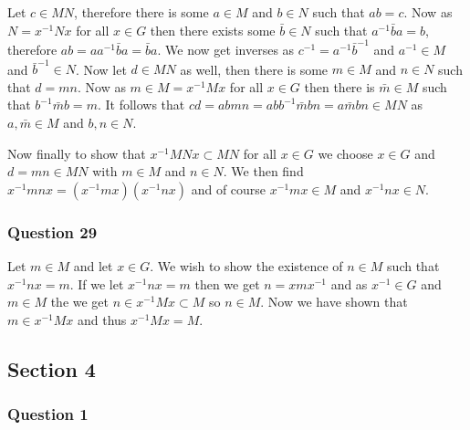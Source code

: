 \documentclass{article}
\begin{document}
Let $c \in MN$, therefore there is some $a \in M$ and $b \in N$ such that $ab = c$. Now as $N = x^{-1}Nx$ for all $x \in G$ then there exists some $\bar b \in N$ such that $a^{-1}\bar ba = b$, therefore $ab = aa^{-1}\bar ba = \bar ba$. We now get inverses as $c^{-1} = a^{-1}\bar b^{-1}$ and $a^{-1} \in M$ and $\bar b^{-1} \in N$. Now let $d \in MN$ as well, then there is some $m \in M$ and $n \in N$ such that $d = mn$. Now as $m \in M = x^{-1}Mx$ for all $x \in G$ then there is $\bar m \in M$ such that $b^{-1}\bar mb = m$. It follows that $cd = abmn = abb^{-1}\bar mbn = a\bar mbn\in MN$ as $a,\bar m \in M$ and $b,n \in N$.

Now finally to show that $x^{-1}MNx \subset MN$ for all $x \in G$ we choose $x \in G$ and $d = mn \in MN$ with $m \in M$ and $n \in N$. We then find $x^{-1}mnx = (x^{-1}mx)(x^{-1}nx)$ and of course $x^{-1}mx \in M$ and $x^{-1}nx \in N$.

\subsubsection{Question 29}

Let $m \in M$ and let $x \in G$. We wish to show the existence of $n \in M$ such that $x^{-1}nx = m$. If we let $x^{-1}nx = m$ then we get $n=xmx^{-1}$ and as $x^{-1}\in G$ and $m\in M$ the we get $n \in x^{-1}Mx \subset M$ so $n \in M$. Now we have shown that $m \in x^{-1}Mx$ and thus $x^{-1}Mx = M$.




\subsection{Section 4}
\subsubsection{Question 1}
\end{document}
